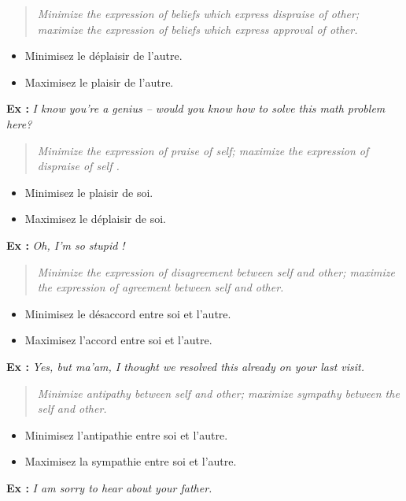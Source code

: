 \begin{quote}\itshape
Minimize the expression of beliefs which express dispraise of other; maximize the expression of beliefs which express approval of other.
\end{quote}
\begin{itemize}
\item Minimisez le déplaisir de l’autre.
\item Maximisez le plaisir de l’autre.
\end{itemize}
\textbf{Ex :} \textit{I know you’re a genius – would you know how to solve this math problem here?}

\begin{quote}\itshape
Minimize the expression of praise of self; maximize the expression of dispraise of self .
\end{quote}
\begin{itemize}
\item Minimisez le plaisir de soi.
\item Maximisez le déplaisir de soi.
\end{itemize}
\textbf{Ex :} \textit{Oh, I’m so stupid !}

\begin{quote}\itshape
Minimize the expression of disagreement between self and other; maximize the expression of agreement between self and other.
\end{quote}
\begin{itemize}
\item Minimisez le désaccord entre soi et l’autre.
\item Maximisez l’accord entre soi et l’autre.
\end{itemize}
\textbf{Ex :} \textit{Yes, but ma’am, I thought we resolved this already on your last visit.}

\begin{quote}\itshape
Minimize antipathy between self and other; maximize sympathy between the self and other.
\end{quote}
\begin{itemize}
\item Minimisez l’antipathie entre soi et l’autre.
\item Maximisez la sympathie entre soi et l’autre.
\end{itemize}
\textbf{Ex :} \textit{I am sorry to hear about your father.}

